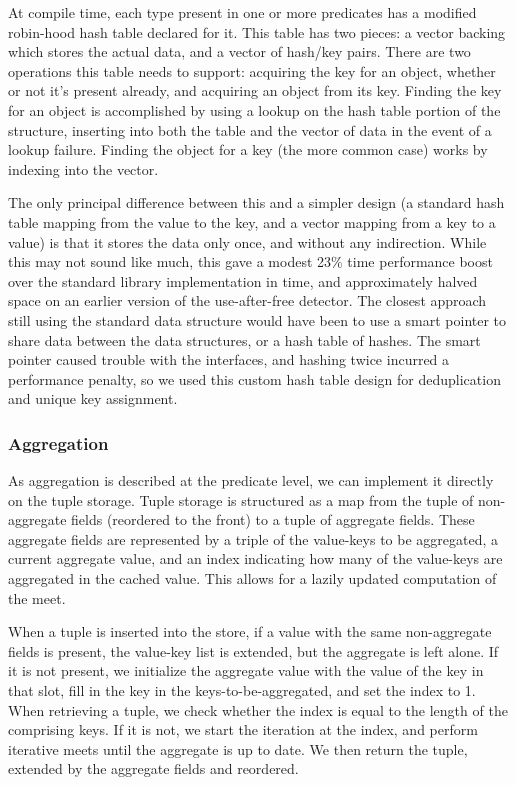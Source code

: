 At compile time, each type present in one or more predicates has a modified robin-hood hash table declared for it.
This table has two pieces: a vector backing which stores the actual data, and a vector of hash/key pairs.
There are two operations this table needs to support: acquiring the key for an object, whether or not it's present already, and acquiring an object from its key.
Finding the key for an object is accomplished by using a lookup on the hash table portion of the structure, inserting into both the table and the vector of data in the event of a lookup failure.
Finding the object for a key (the more common case) works by indexing into the vector.

The only principal difference between this and a simpler design (a standard hash table mapping from the value to the key, and a vector mapping from a key to a value) is that it stores the data only once, and without any indirection.
While this may not sound like much, this gave a modest 23\% time performance boost over the standard library implementation in time, and approximately halved space on an earlier version of the use-after-free detector.
The closest approach still using the standard data structure would have been to use a smart pointer to share data between the data structures, or a hash table of hashes.
The smart pointer caused trouble with the interfaces, and hashing twice incurred a performance penalty, so we used this custom hash table design for deduplication and unique key assignment.

\subsubsection{Aggregation}
As aggregation is described at the predicate level, we can implement it directly on the tuple storage.
Tuple storage is structured as a map from the tuple of non-aggregate fields (reordered to the front) to a tuple of aggregate fields.
These aggregate fields are represented by a triple of the value-keys to be aggregated, a current aggregate value, and an index indicating how many of the value-keys are aggregated in the cached value.
This allows for a lazily updated computation of the meet.

When a tuple is inserted into the store, if a value with the same non-aggregate fields is present, the value-key list is extended, but the aggregate is left alone.
If it is not present, we initialize the aggregate value with the value of the key in that slot, fill in the key in the keys-to-be-aggregated, and set the index to 1.
When retrieving a tuple, we check whether the index is equal to the length of the comprising keys.
If it is not, we start the iteration at the index, and perform iterative meets until the aggregate is up to date.
We then return the tuple, extended by the aggregate fields and reordered.

